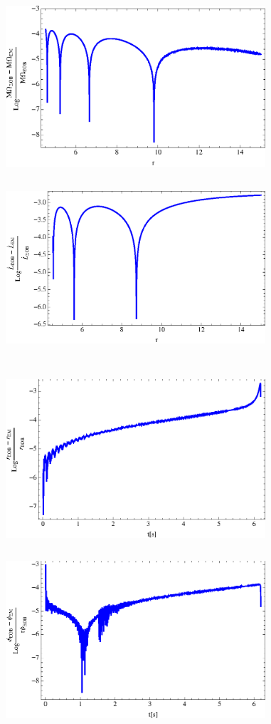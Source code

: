 \begin{figure}[ht]
\centerline{
\includegraphics[height=2.6in, width=3.8in,  clip]{figures/insimri/anfreemc}
\includegraphics[height=2.6in, width=3.8in,  clip]{figures/insimri/amfemc}
}
\centerline{
\includegraphics[height=2.6in, width=3.8in,  clip]{figures/insimri/rteobvsemc}
\includegraphics[height=2.6in, width=3.8in,  clip]{figures/insimri/phiteobvsem}
}
\end{figure}
